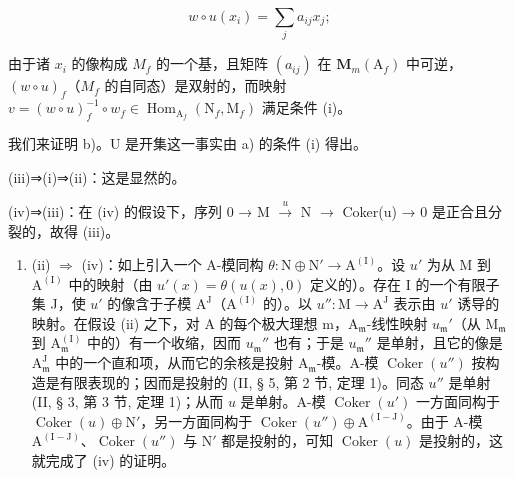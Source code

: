 \[
w \circ u (x _ {i}) = \sum_ {j} a _ {i j} x _ {j};
\]

由于诸 \(x_{i}\) 的像构成 \(M_{f}\) 的一个基，且矩阵 \((a_{ij})\) 在 \(\mathbf{M}_{m}(\mathrm{A}_{f})\) 中可逆，\((w \circ u)_{f}\)（\(M_{f}\) 的自同态）是双射的，而映射 \(v = (w \circ u)_{f}^{-1} \circ w_{f} \in \operatorname{Hom}_{\mathrm{A}_{f}}(\mathrm{N}_{f}, \mathrm{M}_{f})\) 满足条件 (i)。

我们来证明 b)。U 是开集这一事实由 a) 的条件 (i) 得出。

(iii)⇒(i)⇒(ii)：这是显然的。

(iv)⇒(iii)：在 (iv) 的假设下，序列 0 → M \(\xrightarrow{u}\) N \(\longrightarrow\) Coker(u) → 0 是正合且分裂的，故得 (iii)。

\begin{enumerate}
\def\labelenumi{(\roman{enumi})}
\setcounter{enumi}{1}
\tightlist
\item
  (ii) \(\Rightarrow\) (iv)：如上引入一个 A-模同构 \(\theta: \mathrm{N} \oplus \mathrm{N}' \to \mathrm{A}^{(\mathrm{I})}\)。设 \(u'\) 为从 M 到 \(\mathrm{A}^{(\mathrm{I})}\) 中的映射（由 \(u'(x) = \theta(u(x), 0)\) 定义的）。存在 I 的一个有限子集 J，使 \(u'\) 的像含于子模 \(\mathrm{A}^{\mathrm{J}}\)（\(\mathrm{A}^{(\mathrm{I})}\) 的）。以 \(u'': \mathrm{M} \to \mathrm{A}^{\mathrm{J}}\) 表示由 \(u'\) 诱导的映射。在假设 (ii) 之下，对 A 的每个极大理想 m，\(\mathrm{A}_{\mathfrak{m}}\)-线性映射 \(u_{\mathfrak{m}}'\)（从 \(\mathrm{M}_{\mathfrak{m}}\) 到 \(\mathrm{A}_{\mathfrak{m}}^{(\mathrm{I})}\) 中的）有一个收缩，因而 \(u_{\mathfrak{m}}''\) 也有；于是 \(u_{\mathfrak{m}}''\) 是单射，且它的像是 \(\mathrm{A}_{\mathfrak{m}}^{\mathrm{J}}\) 中的一个直和项，从而它的余核是投射 \(\mathrm{A}_{\mathfrak{m}}\)-模。A-模 \(\operatorname{Coker}(u'')\) 按构造是有限表现的；因而是投射的 (II, § 5, 第 2 节, 定理 1)。同态 \(u''\) 是单射 (II, § 3, 第 3 节, 定理 1)；从而 \(u\) 是单射。A-模 \(\operatorname{Coker}(u')\) 一方面同构于 \(\operatorname{Coker}(u) \oplus \mathrm{N}'\)，另一方面同构于 \(\operatorname{Coker}(u'') \oplus \mathrm{A}^{(\mathrm{I}-\mathrm{J})}\)。由于 A-模 \(\mathrm{A}^{(\mathrm{I}-\mathrm{J})}\)、\(\operatorname{Coker}(u'')\) 与 \(\mathrm{N}'\) 都是投射的，可知 \(\operatorname{Coker}(u)\) 是投射的，这就完成了 (iv) 的证明。
\end{enumerate}
